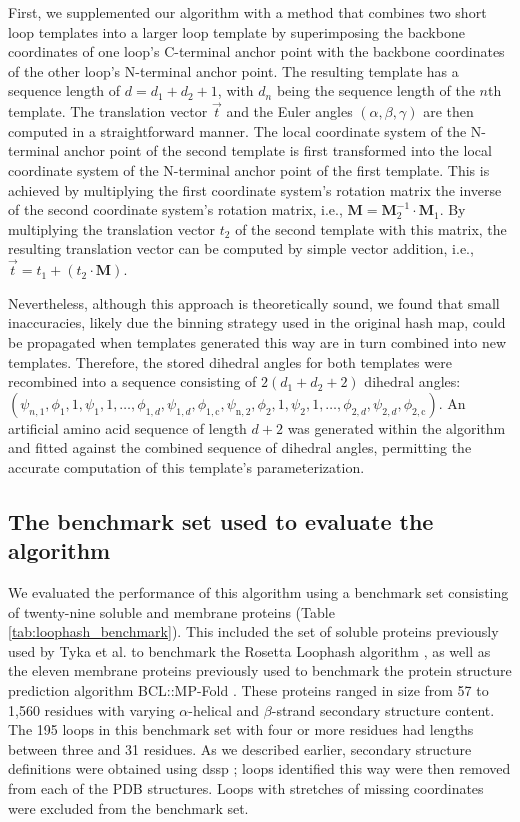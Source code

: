 First, we supplemented our algorithm with a method that combines two short loop templates into a larger loop template by superimposing the backbone coordinates of one loop's C-terminal anchor point with the backbone coordinates of the other loop's N-terminal anchor point. The resulting template has a sequence length of $d=d_1+d_2+1$, with $d_n$ being the sequence length of the $n$th template. The translation vector $\vec{t}$ and the Euler angles $(\alpha,\beta,\gamma)$ are then computed in a straightforward manner. The local coordinate system of the N-terminal anchor point of the second template is first transformed into the local coordinate system of the N-terminal anchor point of the first template. This is achieved by multiplying the first coordinate system's rotation matrix the inverse of the second coordinate system's rotation matrix, i.e., $\mathbf{M}=\mathbf{M}_2^{-1}\cdot \mathbf{M}_1$. By multiplying the translation vector $t_2$ of the second template with this matrix, the resulting translation vector can be computed by simple vector addition, i.e., $\vec{t}=t_1+(t_2\cdot \mathbf{M})$.

Nevertheless, although this approach is theoretically sound, we found that small inaccuracies, likely due the binning strategy used in the original hash map, could be propagated when templates generated this way are in turn combined into new templates. Therefore, the stored dihedral angles for both templates were recombined into a sequence consisting of $2(d_1+d_2+2)$ dihedral angles: $(\psi_{n,1},\phi_1,1,\psi_1,1,…,\phi_{1,d},\psi_{1,d},\phi_{1,\mathup{c}},\psi_{\mathup{n},2},\phi_2,1,\psi_2,1,…,\phi_{2,d},\psi_{2,d},\phi_{2,\mathup{c}})$. An artificial amino acid sequence of length $d+2$ was generated within the algorithm and fitted against the combined sequence of dihedral angles, permitting the accurate computation of this template's parameterization. 

\subsection{The benchmark set used to evaluate the algorithm}

We evaluated the performance of this algorithm using a benchmark set consisting of twenty-nine soluble and membrane proteins (Table \ref{tab:loophash_benchmark}). This included the set of soluble proteins previously used by Tyka et al. to benchmark the Rosetta Loophash algorithm \citep*{Tyka2012}, as well as the eleven membrane proteins previously used to benchmark the protein structure prediction algorithm BCL::MP-Fold \citep*{Fischer2015}. These proteins ranged in size from 57 to 1,560 residues with varying $\alpha$-helical and $\beta$-strand secondary structure content. The 195 loops in this benchmark set with four or more residues had lengths between three and 31 residues. As we described earlier, secondary structure definitions were obtained using \gls{dssp} \citep*{Kabsch1983}; loops identified this way were then removed from each of the PDB structures. Loops with stretches of missing coordinates were excluded from the benchmark set.


